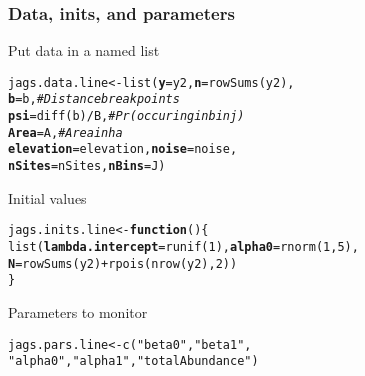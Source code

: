 \documentclass[color=usenames,dvipsnames]{beamer}\usepackage[]{graphicx}\usepackage[]{xcolor}
\makeatletter
\newcommand{\hlnum}[1]{\textcolor[rgb]{0.69,0.494,0}{#1}}%
\newcommand{\hlstr}[1]{\textcolor[rgb]{0.749,0.012,0.012}{#1}}%
\newcommand{\hlcom}[1]{\textcolor[rgb]{0.514,0.506,0.514}{\textit{#1}}}%
\newcommand{\hlopt}[1]{\textcolor[rgb]{0,0,0}{#1}}%
\newcommand{\hlstd}[1]{\textcolor[rgb]{0,0,0}{#1}}%
\newcommand{\hlkwa}[1]{\textcolor[rgb]{0,0,0}{\textbf{#1}}}%
\newcommand{\hlkwb}[1]{\textcolor[rgb]{0,0.341,0.682}{#1}}%
\newcommand{\hlkwc}[1]{\textcolor[rgb]{0,0,0}{\textbf{#1}}}%
\newcommand{\hlkwd}[1]{\textcolor[rgb]{0.004,0.004,0.506}{#1}}%
\newenvironment{kframe}{%
 \def\at@end@of@kframe{}%
 \ifinner\ifhmode%
  \def\at@end@of@kframe{\end{minipage}}%
  \begin{minipage}{\columnwidth}%
 \fi\fi%
 \def\FrameCommand##1{\hskip\@totalleftmargin \hskip-\fboxsep
 \colorbox{shadecolor}{##1}\hskip-\fboxsep
     \hskip-\linewidth \hskip-\@totalleftmargin \hskip\columnwidth}%
 \MakeFramed {\advance\hsize-\width
   \@totalleftmargin\z@ \linewidth\hsize
   \@setminipage}}%
 {\par\unskip\endMakeFramed%
 \at@end@of@kframe}
\newenvironment{knitrout}{}{} %
\makeatother
\begin{document}
\begin{frame}[fragile]
  \frametitle{Data, inits, and parameters}
  Put data in a named list
  \vspace{-12pt}
\begin{knitrout}\footnotesize
{}\color{fgcolor}\begin{kframe}
\begin{alltt}
\hlstd{jags.data.line} \hlkwb{<-} \hlkwd{list}\hlstd{(}\hlkwc{y}\hlstd{=y2,} \hlkwc{n}\hlstd{=}\hlkwd{rowSums}\hlstd{(y2),}
                       \hlkwc{b}\hlstd{=b,}           \hlcom{# Distance break points}
                       \hlkwc{psi}\hlstd{=}\hlkwd{diff}\hlstd{(b)}\hlopt{/}\hlstd{B,} \hlcom{# Pr(occuring in bin j)}
                       \hlkwc{Area}\hlstd{=A,}        \hlcom{# Area in ha}
                       \hlkwc{elevation}\hlstd{=elevation,} \hlkwc{noise}\hlstd{=noise,}
                       \hlkwc{nSites}\hlstd{=nSites,} \hlkwc{nBins}\hlstd{=J)}
\end{alltt}
\end{kframe}
\end{knitrout}
\pause
\vfill
  Initial values
  \vspace{-12pt}
\begin{knitrout}\footnotesize
{}\color{fgcolor}\begin{kframe}
\begin{alltt}
\hlstd{jags.inits.line} \hlkwb{<-} \hlkwa{function}\hlstd{() \{}
    \hlkwd{list}\hlstd{(}\hlkwc{lambda.intercept}\hlstd{=}\hlkwd{runif}\hlstd{(}\hlnum{1}\hlstd{),} \hlkwc{alpha0}\hlstd{=}\hlkwd{rnorm}\hlstd{(}\hlnum{1}\hlstd{,} \hlnum{5}\hlstd{),}
         \hlkwc{N}\hlstd{=}\hlkwd{rowSums}\hlstd{(y2)}\hlopt{+}\hlkwd{rpois}\hlstd{(}\hlkwd{nrow}\hlstd{(y2),} \hlnum{2}\hlstd{))}
\hlstd{\}}
\end{alltt}
\end{kframe}
\end{knitrout}
\pause
\vfill
  Parameters to monitor
  \vspace{-12pt}
\begin{knitrout}\small
{}\color{fgcolor}\begin{kframe}
\begin{alltt}
\hlstd{jags.pars.line} \hlkwb{<-} \hlkwd{c}\hlstd{(}\hlstr{"beta0"}\hlstd{,} \hlstr{"beta1"}\hlstd{,}
                    \hlstr{"alpha0"}\hlstd{,} \hlstr{"alpha1"}\hlstd{,} \hlstr{"totalAbundance"}\hlstd{)}
\end{alltt}
\end{kframe}
\end{knitrout}
\end{frame}
\end{document}
